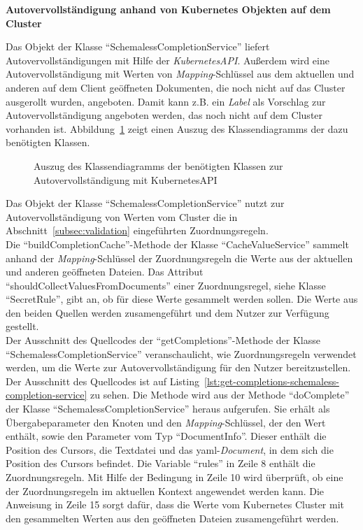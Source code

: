 \textbf{Autovervollständigung anhand von Kubernetes Objekten auf dem Cluster}

Das Objekt der Klasse ``SchemalessCompletionService'' liefert Autovervollständigungen mit Hilfe der \textit{KubernetesAPI}.
Außerdem wird eine Autovervollständigung
mit Werten von \textit{Mapping}-Schlüssel aus dem aktuellen und anderen auf dem Client geöffneten Dokumenten,
die noch nicht auf das Cluster ausgerollt wurden, angeboten.
Damit kann z.B. ein \textit{Label} als Vorschlag zur Autovervollständigung angeboten werden, das noch nicht auf dem Cluster vorhanden ist.
Abbildung~\ref{fig:class-diagram-yaml-language-service-schemaless-completion} zeigt einen Auszug des Klassendiagramms der dazu benötigten Klassen.

\begin{figure}[htp] %
  \centering
  \caption{Auszug des Klassendiagramms der benötigten Klassen zur Autovervollständigung mit KubernetesAPI}
  \label{fig:class-diagram-yaml-language-service-schemaless-completion}
\end{figure}

Das Objekt der Klasse ``SchemalessCompletionService'' nutzt zur Autovervollständigung von Werten vom Cluster die
in Abschnitt~\ref{subsec:validation} eingeführten Zuordnungsregeln.
\\
Die ``buildCompletionCache''-Methode der Klasse ``CacheValueService'' sammelt anhand der \textit{Mapping}-Schlüssel
der Zuordnungsregeln die Werte aus der aktuellen und anderen geöffneten Dateien.
Das Attribut ``shouldCollectValuesFromDocuments'' einer Zuordnungsregel, siehe Klasse ``SecretRule'', gibt an,
ob für diese Werte gesammelt werden sollen.
Die Werte aus den beiden Quellen werden zusamengeführt und dem Nutzer zur Verfügung gestellt.
\\
Der Ausschnitt des Quellcodes der ``getCompletions''-Methode der Klasse ``SchemalessCompletionService'' veranschaulicht,
wie Zuordnungsregeln verwendet werden, um die Werte zur Autovervollständigung für den Nutzer bereitzustellen.
Der Ausschnitt des Quellcodes ist auf Listing~\ref{lst:get-completions-schemaless-completion-service} zu sehen. Die Methode wird aus der Methode ``doComplete'' der Klasse ``SchemalessCompletionService'' heraus aufgerufen.
Sie erhält als Übergabeparameter den Knoten und den \textit{Mapping}-Schlüssel, der den Wert enthält, sowie den Parameter vom Typ
``DocumentInfo''. Dieser enthält die Position des Cursors, die Textdatei und das \ac{yaml}-\textit{Document}, in dem sich die
Position des Cursors befindet. Die Variable ``rules'' in Zeile 8 enthält die Zuordnungsregeln.
Mit Hilfe der Bedingung in Zeile 10 wird überprüft, ob eine der Zuordnungsregeln im aktuellen Kontext angewendet werden kann.
Die Anweisung in Zeile 15 sorgt dafür, dass die Werte vom Kubernetes Cluster mit den gesammelten Werten
aus den geöffneten Dateien zusamengeführt werden.

